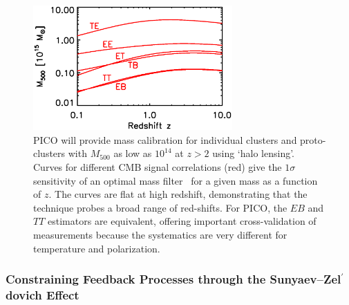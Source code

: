 \documentclass[PICOReport.tex]{subfiles}
\begin{document}
\begin{figure}[t]
\hspace{-0.1in}
\parbox{3.1in}{\centerline {
\includegraphics[width=3.0in]{images/m500lim_vs_z_pico_polar_v3.eps} } }
\hspace{0.in}
\parbox{3.4in}{
\caption{\captiontext 
PICO will provide mass calibration for individual clusters and proto-clusters with $M_{500}$ as low as $10^{14}$ at $z>2$ using `halo lensing'. Curves for different CMB signal correlations (red) give the $1\sigma$ sensitivity of an optimal mass filter~\citep{2015A&A...578A..21M} for a given mass as a function of $z$.  The curves are flat at high redshift, demonstrating that the technique probes a broad range of red-shifts. For PICO, the $EB$ and $TT$ estimators are equivalent, offering important cross-validation of measurements because the systematics are very different for temperature and polarization. 
\label{fig:HaloLensing} 
} }
\vspace{-0.1in}
\end{figure}

\subsubsection{Constraining Feedback Processes through the Sunyaev--Zel$^{\prime}$dovich Effect}
\label{sec:sz}


\end{document}
